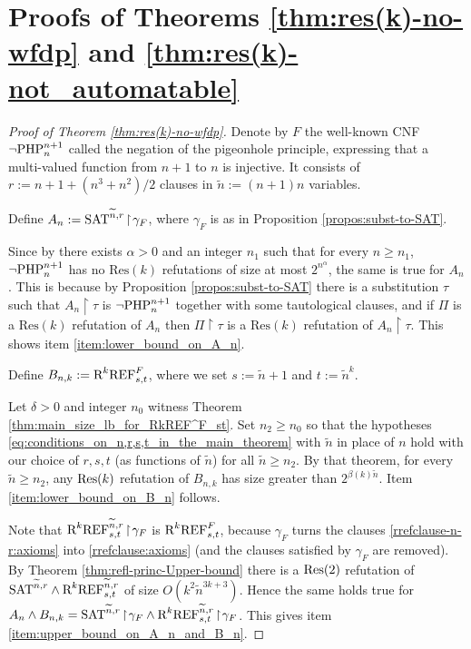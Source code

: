 \section{Proofs of Theorems \ref{thm:res(k)-no-wfdp}
 and \ref{thm:res(k)-not_automatable}}

\begin{proof}[Proof of Theorem \ref{thm:res(k)-no-wfdp}]
Denote by $F$ the well-known CNF $\neg \textnormal{PHP}^{n+1}_n$ called the negation of the pigeonhole principle, expressing that a multi-valued function from $n+1$ to $n$ is injective. It consists of $r := n+1+ (n^3+n^2)/2$ clauses in $\widetilde{n} := (n+1)n$ variables. 

Define $A_n := \textnormal{SAT}^{\widetilde{n},r} \! \restriction \! \gamma_F$, where $\gamma_F$ is as in Proposition \ref{propos:subst-to-SAT}. 

Since by \cite{Krajicek-Pudlak-Woods1995, Pitassi-Beame-Impagliazzo1993} there exists $\alpha > 0$ and an integer $n_1$ such that for every $n \geq n_1$, $\neg \textnormal{PHP}^{n+1}_n$ has no $\text{Res}(k)$ refutations of size at most $2^{n^{\alpha}}$, the same is true for $A_n$. This is because by Proposition \ref{propos:subst-to-SAT} there is a substitution $\tau$ such that $A_n \! \restriction \! \tau$ is $\neg \textnormal{PHP}^{n+1}_n$ together with some tautological clauses, and if $\Pi$ is a $\text{Res}(k)$ refutation of $A_n$ then $\Pi \! \restriction \! \tau$ is a $\text{Res}(k)$ refutation of $A_n \! \restriction \! \tau$. This shows item \ref{item:lower_bound_on_A_n}.

Define $B_{n,k} := \textnormal{R}^k\textnormal{REF}^{F}_{s,t}$, where we set $s := \widetilde{n} +1$ and $t := \widetilde{n}^k$.

Let $\delta > 0$ and integer $n_0$ witness Theorem \ref{thm:main_size_lb_for_RkREF^F_st}. Set $n_2 \geq n_0$ so that the hypotheses \eqref{eq:conditions_on_n,r,s,t_in_the_main_theorem} with $\widetilde{n}$ in place of $n$ hold with our choice of $r,s,t$ (as functions of $\widetilde{n}$) for all $\widetilde{n} \geq n_2$. 
By that theorem, for every $\widetilde{n} \geq n_2$, any $\textnormal{Res}(k)$ refutation of $B_{n,k}$ has size greater than $2^{\beta(k) \widetilde{n}}$. Item \ref{item:lower_bound_on_B_n} follows.

Note that $\textnormal{R}^k\textnormal{REF}^{\widetilde{n},r}_{s,t} \! \restriction \!  \gamma_F$ is $\textnormal{R}^k\textnormal{REF}^{F}_{s,t}$, because $\gamma_F$ turns the clauses \eqref{rrefclause-n-r:axioms} into \eqref{rrefclause:axioms} (and the clauses satisfied by $\gamma_F$ are removed). By Theorem \ref{thm:refl-princ-Upper-bound} there is a $\textnormal{Res}(2)$ refutation of $\textnormal{SAT}^{\widetilde{n},r} \land \textnormal{R}^k\textnormal{REF}^{\widetilde{n},r}_{s,t}$ of size $O(k^2 \widetilde{n}^{3k+3})$. Hence the same holds true for $A_n \land B_{n,k} = \textnormal{SAT}^{\widetilde{n},r} \! \restriction \! \gamma_F \land \textnormal{R}^k\textnormal{REF}^{\widetilde{n},r}_{s,t} \! \restriction \!  \gamma_F$. This gives item \ref{item:upper_bound_on_A_n_and_B_n}.
\end{proof}


